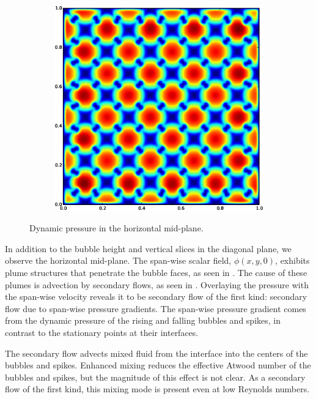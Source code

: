 \begin{figure}
\begin{subfigure}[b]{0.32\textwidth}
\end{subfigure}
\begin{subfigure}[b]{0.32\textwidth}
  \includegraphics[width=\textwidth]{figs/dynamic_pressure-45-10}
\end{subfigure}
\caption{ 
Dynamic pressure in the horizontal mid-plane.
}
\end{figure}


In addition to the bubble height and vertical slices in the diagonal plane, we observe the horizontal mid-plane.
The span-wise scalar field, $\phi(x,y,0)$, exhibits plume structures that penetrate the bubble faces, as seen in .
The cause of these plumes is advection by secondary flows, as seen in .
Overlaying the pressure with the span-wise velocity reveals it to be secondary flow of the first kind: secondary flow due to span-wise pressure gradients.
The span-wise pressure gradient comes from the dynamic pressure of the rising and falling bubbles and spikes, in contrast to the stationary points at their interfaces.

The secondary flow advects mixed fluid from the interface into the centers of the bubbles and spikes.
Enhanced mixing reduces the effective Atwood number of the bubbles and spikes, but the magnitude of this effect is not clear.
As a secondary flow of the first kind, this mixing mode is present even at low Reynolds numbers.

